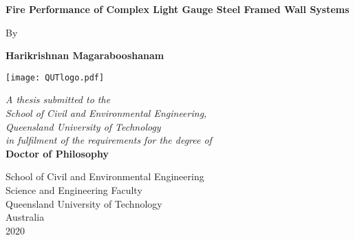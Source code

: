 \begin{titlepage}
    \begin{center}
        \vspace*{0.5cm}
        \Huge
        \textbf{Fire Performance of Complex Light Gauge Steel Framed Wall Systems}
        
        \vspace{1cm}
        \Large
        By
        
        \vspace{1cm}
        \LARGE
        \textbf{Harikrishnan Magarabooshanam}
        \vspace{1.5cm}
        
        \texttt{[image: QUTlogo.pdf]}
        
        \vspace{1cm}
        \large
        \centering \textit{A thesis submitted to the\\ School of Civil and Environmental Engineering,\\ Queensland University of Technology \\in fulfilment of the requirements for the degree of}\\
        \vspace{1cm}
        \LARGE
       \textbf{ Doctor of Philosophy}
        \vspace{1cm}
        
      \linespread{1.2}
      \small    
        School of Civil and Environmental Engineering\\   
        Science and Engineering Faculty\\     
        Queensland University of Technology\\        
        Australia\\
        2020 
    \end{center}
\end{titlepage}